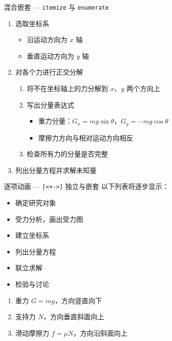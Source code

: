 \documentclass[darkmode=false, randomquote=true, quoteseed=2026, shownav=false,handout=false]{HiBeamer}
\begin{document}
\begin{frame}{混合嵌套 --- \texttt{itemize} 与 \texttt{enumerate}}
  \begin{enumerate}
    \item 选取坐标系
    \begin{itemize}
      \item 沿运动方向为 $x$ 轴
      \item 垂直运动方向为 $y$ 轴
    \end{itemize}
    \item 对各个力进行正交分解
    \begin{enumerate}
      \item 将不在坐标轴上的力分解到 $x$、$y$ 两个方向上
      \item 写出分量表达式
      \begin{itemize}
        \item 重力分量：$G_x = mg\sin\theta$，$G_y = -mg\cos\theta$
        \item 摩擦力方向与相对运动方向相反
      \end{itemize}
      \item 检查所有力的分量是否完整
    \end{enumerate}
    \item 列出分量方程并求解未知量
  \end{enumerate}
\end{frame}

\begin{frame}{逐项动画 --- \texttt{[<+->]} 独立与嵌套}
  以下列表将逐步显示：
  \begin{itemize}[<+->]
    \item 确定研究对象
    \item 受力分析，画出受力图
    \item 建立坐标系
    \item 列出分量方程
    \item 联立求解
    \item 检验与讨论
  \end{itemize}

  \vspace{0.5em}

  \begin{enumerate}[<+->]
    \item 重力 $G = mg$，方向竖直向下
    \item 支持力 $N$，方向垂直斜面向上
    \item 滑动摩擦力 $f = \mu N$，方向沿斜面向上
  \end{enumerate}
\end{frame}
\end{document}
